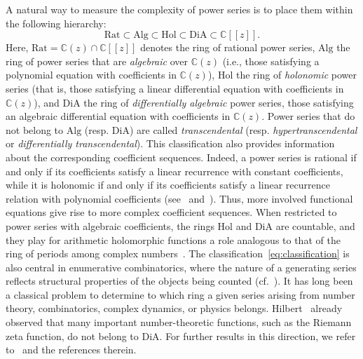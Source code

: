 \documentclass[11pt,a4paper]{article}
\theoremstyle{plain}
\theoremstyle{remark}
\theoremstyle{custombold}
\begin{document}
A natural way to measure the complexity of power series is to place them within the following hierarchy:
\begin{equation}\label{eq:classification}
 \mathrm{Rat} \subset \mathrm{Alg} \subset \mathrm{Hol} \subset \mathrm{DiA} \subset \mathbb{C}[[z]].
\end{equation}
Here, $\mathrm{Rat} = \mathbb{C}(z) \cap \mathbb{C}[[z]]$ denotes the ring of rational power series, $\mathrm{Alg}$ the ring of power series that are \emph{algebraic} over $\mathbb{C}(z)$ (i.e., those satisfying a polynomial equation with coefficients in $\mathbb{C}(z)$), $\mathrm{Hol}$ the ring of \emph{holonomic} power series (that is, those satisfying a linear differential equation with coefficients in $\mathbb{C}(z)$), and $\mathrm{DiA}$ the ring of \emph{differentially algebraic} power series, those satisfying an algebraic differential equation with coefficients in $\mathbb C(z)$. 
Power series that do not belong to $\mathrm{Alg}$ (resp. $\mathrm{DiA}$) are called \emph{transcendental} (resp. \emph{hypertranscendental} or \emph{differentially transcendental}).  
This classification also provides information about the corresponding coefficient sequences. Indeed, a power series is rational if and only if its coefficients satisfy a linear recurrence with constant coefficients, while it is holonomic if and only if its coefficients satisfy a linear recurrence relation with polynomial coefficients (see~\cite[Chapter~4]{Stanley-Enumerative-Combinatorics-2011} and~\cite[Chapter~6]{Stanley-Fomin-vol2-1999}). Thus, more involved functional equations give rise to more complex coefficient sequences. 
When restricted to power series with algebraic coefficients, the rings $\mathrm{Hol}$ and $\mathrm{DiA}$ are countable, and they play for arithmetic holomorphic functions a role analogous to that of the ring of periods among complex numbers~\cite{Kontsevich-Zagier-2001}. The classification~\eqref{eq:classification} is also central in enumerative combinatorics, where the nature of a generating series reflects structural properties of the objects being counted (cf.~\cite{Bousquet-Melou-2006}). 
It has long been a classical problem to determine to which ring a given series arising from number theory, combinatorics, complex dynamics, or physics belongs. 
Hilbert~\cite{Hilbert-1902}   already observed that many important number-theoretic functions, such as the Riemann zeta function, do not belong to $\mathrm{DiA}$. For further results in this direction, we refer to~\cite{Stanley-1980,Becker-Topfer-94,Stanley-Fomin-vol2-1999,Adamczewski-Dreyfus-Hardouin-2021} and the references therein.  
\end{document}
